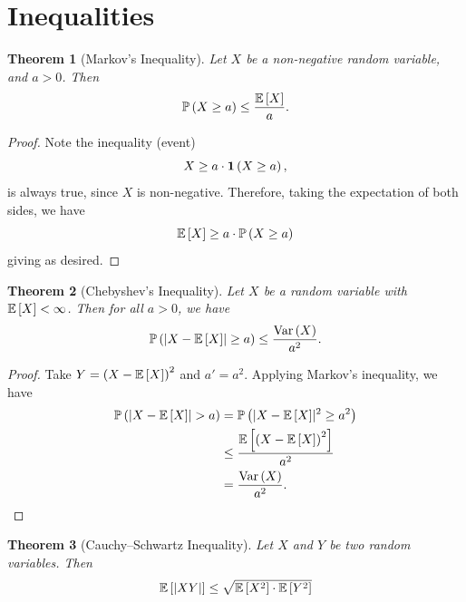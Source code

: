 \documentclass{article}
\newtheorem{theorem}{Theorem}[section]
\theoremstyle{definition}
\theoremstyle{remark}
\DeclarePairedDelimiter{\abs}{\lvert}{\rvert}
\newcommand{\Prob}{\mathbb{P}}
\newcommand{\Expt}{\mathbb{E}}
\newcommand{\indicator}{\mathbf{1}}
\newcommand{\Var}{\operatorname{Var}}
\begin{document}
\section{Inequalities}

\begin{theorem}[Markov's Inequality]
    \label{thm:markov-inequality}%
    Let \(X\) be a non-negative random variable, and \(a > 0\). Then
    \[
        \Prob\pqty{X \geq a} \leq \frac{\Expt\bqty{X}}{a}.
    \]
\end{theorem}

\begin{proof}
    Note the inequality (event)
    \[
        X \geq a \cdot \indicator\pqty{X \geq a},
    \]
    is always true, since \(X\) is non-negative. Therefore, taking the expectation of both sides, we have
    \[
        \Expt\bqty{X} \geq a \cdot \Prob\pqty{X \geq a}
    \]
    giving as desired.
\end{proof}

\begin{theorem}[Chebyshev's Inequality]
    \label{thm:chebyshev-inequality}%
    Let \(X\) be a random variable with \(\Expt\bqty{X} < \infty\). Then for all \(a > 0\), we have
    \[
        \Prob\pqty{\abs{X - \Expt\bqty{X}} \geq a} \leq \frac{\Var\pqty{X}}{a^2}.
    \]
\end{theorem}

\begin{proof}
    Take \(Y = \pqty{X - \Expt\bqty{X}}^2\) and \(a' = a^2\). Applying Markov's inequality, we have
    \begin{align*}
        \Prob\pqty{\abs{X - \Expt\bqty{X}} > a} &= \Prob\pqty{\abs{X - \Expt\bqty{X}}^2 \geq a^2} \\
        &\leq \frac{\Expt\bqty{\pqty{X - \Expt\bqty{X}}^2}}{a^2} \\
        &= \frac{\Var\pqty{X}}{a^2}.
    \end{align*}
\end{proof}

\begin{theorem}[Cauchy--Schwartz Inequality]
    \label{thm:cauchy-schwartz-inequality}%
    Let \(X\) and \(Y\) be two random variables. Then
    \[
        \Expt\bqty{\abs{XY}} \leq \sqrt{\Expt\bqty{X^2} \cdot \Expt\bqty{Y^2}}
    \]
\end{theorem}
\end{document}

